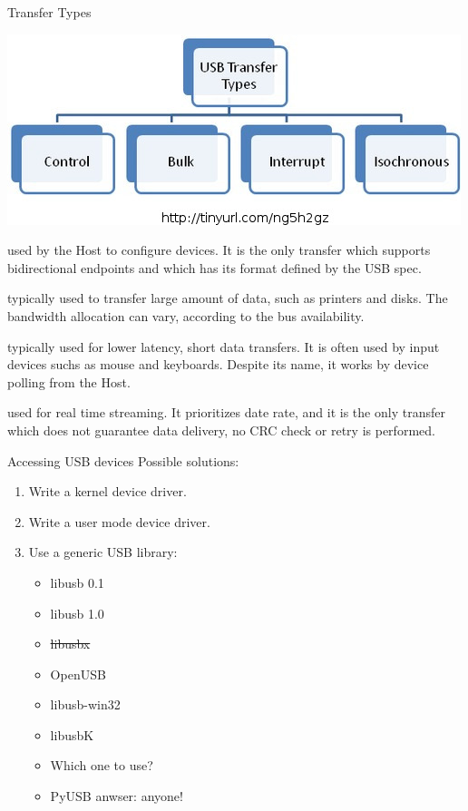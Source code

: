 \documentclass[pdf]{beamer}
\begin{document}
\begin{frame}{Transfer Types}
  \begin{center}
    \includegraphics[scale=0.35]{img/transfer_types.jpg}
  \end{center}
  \begin{description}
    \tiny
    \item[Control] used by the Host to configure devices. It is the only transfer
      which supports bidirectional endpoints and which has its format defined by
      the USB spec.
    \item[Bulk] typically used to transfer large amount of data, such as
      printers and disks. The bandwidth allocation can vary, according to the
      bus availability.
    \item[Interrupt] typically used for lower latency, short data transfers. It
      is often used by input devices suchs as mouse and keyboards. Despite its
      name, it works by device polling from the Host.
    \item[Isochronous] used for real time streaming. It prioritizes date rate,
      and it is the only transfer which does not guarantee data delivery, no
      CRC check or retry is performed.
  \end{description}
\end{frame}

\begin{frame}{Accessing USB devices}
  \pause
  Possible solutions:
  \begin{enumerate}
    \pause
    \item Write a kernel device driver.
    \pause
    \item Write a user mode device driver.
    \pause
    \item Use a generic USB library:
      \pause
      \begin{itemize}
          \item libusb 0.1
          \item libusb 1.0
          \item \sout{libusbx}
          \item OpenUSB
          \item libusb-win32
          \item libusbK
      \end{itemize}
      \begin{itemize}
        \pause
        \item Which one to use?
        \pause
        \item PyUSB anwser: anyone!
      \end{itemize}
  \end{enumerate}
\end{frame}
\end{document}
